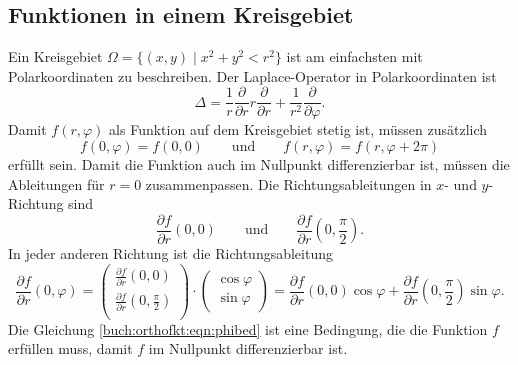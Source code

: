 \subsection{Funktionen in einem Kreisgebiet}
Ein Kreisgebiet $\Omega = \{(x,y)\mid x^2+y^2< r^2\}$ ist am einfachsten
mit Polarkoordinaten zu beschreiben.
Der Laplace-Operator in Polarkoordinaten ist
\[
\Delta 
=
\frac1r \frac{\partial}{\partial r} r \frac{\partial}{\partial r}
+
\frac{1}{r^2} \frac{\partial}{\partial\varphi}.
\]
Damit $f(r,\varphi)$ als
Funktion auf dem Kreisgebiet stetig ist, müssen zusätzlich
\[
f(0,\varphi) = f(0,0)
\qquad\text{und}\qquad
f(r,\varphi) = f(r,\varphi+2\pi)
\]
erfüllt sein.
Damit die Funktion auch im Nullpunkt differenzierbar ist, müssen die
Ableitungen für $r=0$ zusammenpassen.
Die Richtungsableitungen in $x$- und $y$-Richtung sind
\[
\frac{\partial f}{\partial r}(0,0)
\qquad\text{und}\qquad
\frac{\partial f}{\partial r}(0,{\textstyle\frac{\pi}2}).
\]
In jeder anderen Richtung ist die Richtungsableitung
\begin{equation}
\frac{\partial f}{\partial r}(0,\varphi)
=
\begin{pmatrix}
\frac{\partial f}{\partial r}(0,0)\\
\frac{\partial f}{\partial r}(0,{\textstyle\frac{\pi}2})\\
\end{pmatrix}
\cdot
\begin{pmatrix}
\cos\varphi\\
\sin\varphi
\end{pmatrix}
=
\frac{\partial f}{\partial r}(0,0)\cos\varphi
+
\frac{\partial f}{\partial r}(0,{\textstyle\frac{\pi}2})\sin\varphi.
\label{buch:orthofkt:eqn:phibed}
\end{equation}
Die Gleichung
\eqref{buch:orthofkt:eqn:phibed}
ist eine Bedingung, die die Funktion $f$ erfüllen muss, damit $f$
im Nullpunkt differenzierbar ist.

%
%
